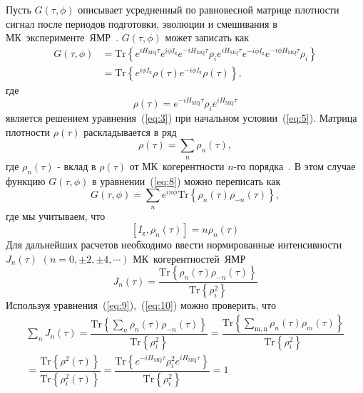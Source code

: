 \documentclass[utf8]{jetp}
\begin{document}
Пусть $G(\tau,\phi)$ описывает усредненный по равновесной матрице плотности сигнал после периодов подготовки, эволюции и смешивания в МК~эксперименте~ЯМР~\cite{Baum_1985}.
$G(\tau,\phi)$ может записать как~\cite{Doronin_2019}
%
\begin{equation}
  \begin{split}
    \label{eq:8}
    G(\tau,\phi)
    & = \mathrm{Tr}\left\{
      e^{i H_\mathrm{MQ} \tau} e^{i\phi I_\mathrm{z}} e^{-i H_\mathrm{MQ}\tau}
      \rho_i
      e^{i H_\mathrm{MQ} \tau} e^{-i \phi I_\mathrm{z}} e^{-i \phi H_\mathrm{MQ} \tau}
      \rho_i
    \right\} \\
    & = \mathrm{Tr} \left\{
    e^{i \phi I_\mathrm{z}}
    \rho(\tau)
    e^{-i \phi I_\mathrm{z}}
    \rho(\tau)
    \right\},
  \end{split}
\end{equation}
%
где
%
\begin{equation}
  \label{eq:9}
  \rho(\tau)
  = e^{-i H_\mathrm{MQ} \tau }
  \rho_i
  e^{i H_\mathrm{MQ} \tau}
\end{equation}
%
является решением уравнения~(\ref{eq:3}) при начальном условии~(\ref{eq:5}).
Матрица плотности $\rho(\tau)$ раскладывается в ряд
%
\begin{equation}
  \label{eq:10}
  \rho(\tau) = \sum\limits_n \rho_n(\tau),
\end{equation}
%
где $\rho_{n}(\tau)$ - вклад в $\rho(\tau)$ от МК~когерентности $n$-го порядка~\cite{Fel_dman_1996}.
В этом случае функцию $G(\tau,\phi)$ в уравнении~(\ref{eq:8}) можно переписать как
%
\begin{equation}
  \label{eq:11}
  G(\tau,\phi)
  = \sum\limits_n e^{i n \phi} \mathrm{Tr} \left\{
    \rho_{n}(\tau) \rho_{-n}(\tau)
  \right\},
\end{equation}
%
где мы учитываем, что
%
\begin{equation}
  \label{eq:12}
  \left[ I_{\mathrm{z}},\rho_n(\tau) \right] = n \rho_n(\tau)
\end{equation}
%
Для дальнейших расчетов необходимо ввести нормированные интенсивности $J_{n}(\tau)$ $(n=0, \pm 2, \pm 4, \cdots)$ МК~когерентностей~ЯМР
%
\begin{equation}
  \label{eq:13}
  J_{n}(\tau) = \dfrac{\mathrm{Tr} \left\{
  \rho_{n}(\tau) \rho_{-n}(\tau)
  \right\}}
  {\mathrm{Tr} \left\{\rho^2_{i} \right\}}
\end{equation}
%
Используя уравнения~(\ref{eq:9}),~(\ref{eq:10}) можно проверить, что
%
\begin{multline}
  \label{eq:14}
  \sum\limits_{n} J_{n}(\tau)
  = \dfrac{
    \mathrm{Tr} \left\{
      \sum_{n} \rho_{n}(\tau) \rho_{-n}(\tau)
    \right\}}
  {\mathrm{Tr} \left\{ \rho^2_{i} \right\}}
  = \dfrac{
    \mathrm{Tr} \left\{
      \sum_{\mathrm{m,n}} \rho_n(\tau)\rho_m(\tau)
  \right\}}
  {\mathrm{Tr} \left\{\rho^2_{i}\right\}}
  \\
  = \dfrac{
    \mathrm{Tr}\left\{\rho^2(\tau)\right\}
  }
  {
    \mathrm{Tr}\left\{\rho^2_{i}(\tau)\right\}
  }
  = \dfrac{
    \mathrm{Tr} \left\{
      e^{-i H_\mathrm{MQ} \tau}
      \rho^{2}_{i}
      e^{i H_\mathrm{MQ} \tau}
    \right\}
  }
  {
    \mathrm{Tr} \left\{ \rho_{i}^{2} \right\}
  }
  = 1
\end{multline}
\end{document}
